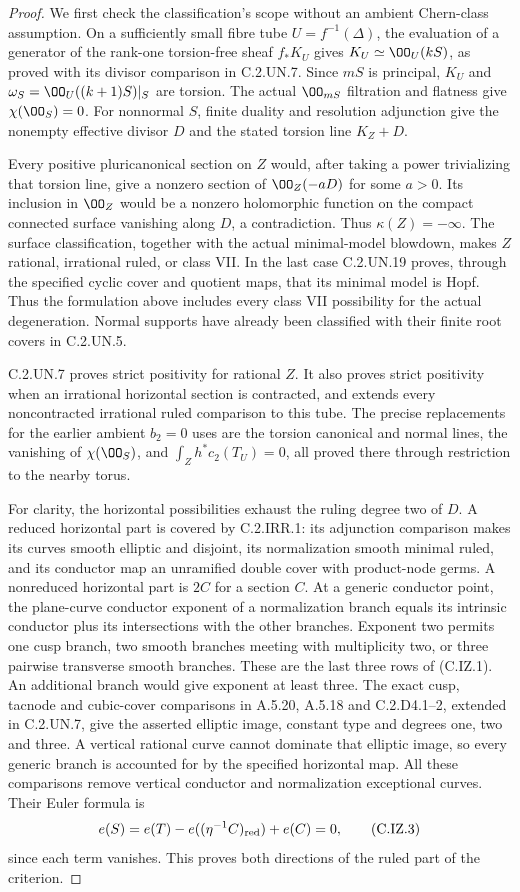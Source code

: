 \begin{proof}
We first check the classification's scope without an ambient
Chern-class assumption. On a sufficiently small fibre tube
$U=f^{-1}(\Delta)$, the evaluation of a generator of the
rank-one torsion-free sheaf $f_*K_U$ gives
$K_U\simeq\OO_U(kS)$, as proved with its divisor comparison
in C.2.UN.7. Since $mS$ is principal, $K_U$ and
$\omega_S=\OO_U((k+1)S)|_S$ are torsion. The actual
$\OO_{mS}$ filtration and flatness give
$\chi(\OO_S)=0$. For nonnormal $S$, finite duality and
resolution adjunction give the nonempty effective divisor
$D$ and the stated torsion line $K_Z+D$.

Every positive pluricanonical section on $Z$ would, after
taking a power trivializing that torsion line, give a
nonzero section of $\OO_Z(-aD)$ for some $a>0$.
Its inclusion in $\OO_Z$ would be a nonzero holomorphic
function on the compact connected surface vanishing along
$D$, a contradiction. Thus $\kappa(Z)=-\infty$.
The surface classification, together with the actual
minimal-model blowdown, makes $Z$ rational, irrational
ruled, or class VII. In the last case C.2.UN.19 proves,
through the specified cyclic cover and quotient maps,
that its minimal model is Hopf. Thus the formulation
above includes every class VII possibility for the
actual degeneration. Normal supports have already been
classified with their finite root covers in C.2.UN.5.

C.2.UN.7 proves strict positivity for rational $Z$.
It also proves strict positivity when an irrational
horizontal section is contracted, and extends every
noncontracted irrational ruled comparison to this tube.
The precise replacements for the earlier ambient $b_2=0$
uses are the torsion canonical and normal lines, the
vanishing of $\chi(\OO_S)$, and
$\int_Zh^*c_2(T_U)=0$, all proved there through restriction
to the nearby torus.

For clarity, the horizontal possibilities exhaust the
ruling degree two of $D$. A reduced horizontal part is
covered by C.2.IRR.1: its adjunction comparison makes its
curves smooth elliptic and disjoint, its normalization
smooth minimal ruled, and its conductor map an unramified
double cover with product-node germs. A nonreduced
horizontal part is $2C$ for a section $C$. At a generic
conductor point, the plane-curve conductor exponent of a
normalization branch equals its intrinsic conductor plus
its intersections with the other branches. Exponent two
permits one cusp branch, two smooth branches meeting with
multiplicity two, or three pairwise transverse smooth
branches. These are the last three rows of (C.IZ.1).
An additional branch would give exponent at least three.
The exact cusp, tacnode and cubic-cover comparisons in
A.5.20, A.5.18 and C.2.D4.1--2, extended in C.2.UN.7,
give the asserted elliptic image, constant type and
degrees one, two and three. A vertical rational curve
cannot dominate that elliptic image, so every generic
branch is accounted for by the specified horizontal map.
All these comparisons remove vertical conductor and
normalization exceptional curves. Their Euler formula is
\[
 e(S)=e(T)-e((\eta^{-1}C)_{\rm red})+e(C)=0,             \tag{C.IZ.3}
\]
since each term vanishes. This proves both directions of
the ruled part of the criterion.


\end{proof}
